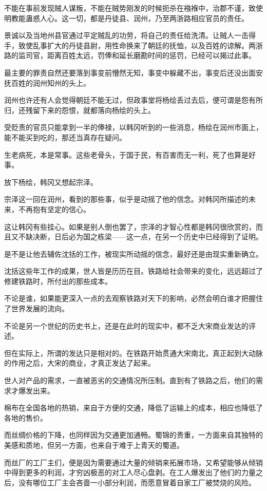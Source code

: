 不能在事前发现贼人谋叛，不能在贼势刚发的时候扼杀在襁褓中，治郡不谨，致使明教能蛊惑人心。这一切，都是丹徒县、润州，乃至两浙路相应官员的责任。

景诚以及当地州县官通过平定贼乱的功劳，将自己的责任给洗清。让贼人一击得手，致使乱事扩大的丹徒县尉，用性命换来了朝廷的抚恤，以及百姓的谅解。两浙路的监司官，距离百姓太远，罚俸和延长磨勘时间的惩罚，已经可以揭过此事。

最主要的罪责自然还要落到事变前懵然无知，事变中躲藏不出，事变后还没出面安抚百姓的润州知州的头上。

润州也许还有人会觉得朝廷不能无过，但政事堂将杨绘丢过去后，便可谓是怨有所归，还残留下来的怨恨，就都落向杨绘的头上。

受贬责的官员只能拿到一半的俸禄，以韩冈听到的一些消息，杨绘在润州市面上，能不能买到吃的，那还当真存在疑问。

生老病死，本是常事。这些老骨头，于国于民，有百害而无一利，死了也算是好事。

放下杨绘，韩冈又想起宗泽。

宗泽这一回在润州，看到的那些事，似乎是动摇了他的信念。对韩冈所描述的未来，不再抱有坚定的信心。

这让韩冈有些挂心。如果是别人倒也罢了，宗泽的才智心性都是韩冈很欣赏的，而且又不缺决断，日后必为国之栋梁——这一点，在另一个历史中已经得到了证明。

是不是让他去辅佐沈括的工作，被现实所动摇的信念，最好还是由现实重新确立。

沈括这些年工作的成果，世人皆是历历在目。铁路给社会带来的变化，远远超过了修建铁路时，所付出的那些成本。

不论是谁，如果能更深入一点的去观察铁路对天下的影响，必然会明白谁才把握住了世界发展的流向。

不论是另一个世纪的历史书上，还是在此时的现实中，都不乏大宋商业发达的评述。

但在实际上，所谓的发达只是相对的。在铁路开始贯通大宋南北，真正起到大动脉的作用之后，大宋的商业，才真正发达了起来。

世人对产品的需求，一直被恶劣的交通情况所压制。直到有了铁路之后，他们的需求才爆发出来。

棉布在全国各地的热销，来自于方便的交通，降低了运输上的成本，相应也降低了各地的售价。

而丝绸价格的下降，也同样因为交通更加通畅。蜀锦的贵重，一方面来自其独特的美感和质地，但另一方面，也来自于难于上青天的蜀道。

而丝厂的工厂主们，便是因为需要通过大量的倾销来拓展市场，又希望能够从倾销中得到更多的利润，才穷凶极恶的对工人尽心盘剥。在工人爆发出了他们的力量之后，没有哪位工厂主会吝啬一小部分利润，而愿意冒着自家工厂被焚烧的风险。

